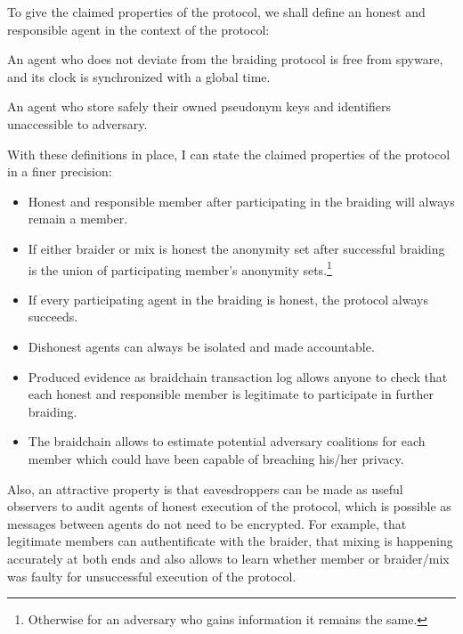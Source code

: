 \documentclass[12pt]{article}
\newenvironment{definition}[2][Definition]{\begin{trivlist}
\item[\hskip \labelsep {\bfseries #1}\hskip \labelsep {\bfseries #2.}]}{\end{trivlist}}
\begin{document}
To give the claimed properties of the protocol, we shall define an honest and responsible agent in the context of the protocol:
\begin{definition}{(honest agent)}
  An agent who does not deviate from the braiding protocol is free from spyware, and its clock is synchronized with a global time.
\end{definition}
\begin{definition}{(responsable agent)}
  An agent who store safely their owned pseudonym keys and identifiers unaccessible to adversary.
\end{definition}
With these definitions in place, I can state the claimed properties of the protocol in a finer precision:
\begin{itemize}
\item Honest and responsible member after participating in the braiding will always remain a member.
\item If either braider or mix is honest the anonymity set after successful braiding is the union of participating member's anonymity sets.\footnote{Otherwise for an adversary who gains information it remains the same.}
\item If every participating agent in the braiding is honest, the protocol always succeeds.
\item Dishonest agents can always be isolated and made accountable. 
\item Produced evidence as braidchain transaction log allows anyone to check that each honest and responsible member is legitimate to participate in further braiding.
\item The braidchain allows to estimate potential adversary coalitions for each member which could have been capable of breaching his/her privacy.
\end{itemize}
Also, an attractive property is that eavesdroppers can be made as useful observers to audit agents of honest execution of the protocol, which is possible as messages between agents do not need to be encrypted. For example, that legitimate members can authentificate with the braider, that mixing is happening accurately at both ends and also allows to learn whether member or braider/mix was faulty for unsuccessful execution of the protocol.
\end{document}
